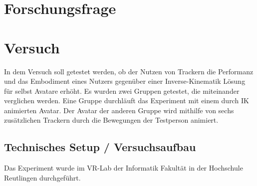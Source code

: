 \chapter{Forschungsfrage}

\chapter{Versuch}
In dem Versuch soll getestet werden, ob der Nutzen von Trackern die Performanz und das Embodiment eines Nutzers gegenüber einer Inverse-Kinematik Lösung für selbst Avatare erhöht. Es wurden zwei Gruppen getestet, die miteinander verglichen werden. Eine Gruppe durchläuft das Experiment mit einem durch IK animierten Avatar. Der Avatar der anderen Gruppe wird mithilfe von sechs zusätzlichen Trackern durch die Bewegungen der Testperson animiert.

\section{Technisches Setup / Versuchsaufbau}
Das Experiment wurde im VR-Lab der Informatik Fakultät in der Hochschule Reutlingen durchgeführt. 




